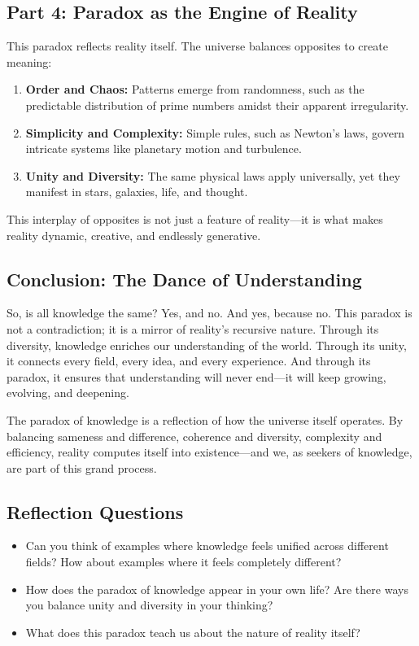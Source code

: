 \documentclass[12pt]{article}
\begin{document}
\subsection*{Part 4: Paradox as the Engine of Reality}
This paradox reflects reality itself. The universe balances opposites to create meaning:
\begin{enumerate}
    \item \textbf{Order and Chaos:} Patterns emerge from randomness, such as the predictable distribution of prime numbers amidst their apparent irregularity.
    
    \item \textbf{Simplicity and Complexity:} Simple rules, such as Newton's laws, govern intricate systems like planetary motion and turbulence.
    
    \item \textbf{Unity and Diversity:} The same physical laws apply universally, yet they manifest in stars, galaxies, life, and thought.
\end{enumerate}

This interplay of opposites is not just a feature of reality—it is what makes reality dynamic, creative, and endlessly generative.

\subsection*{Conclusion: The Dance of Understanding}
So, is all knowledge the same? Yes, and no. And yes, because no. This paradox is not a contradiction; it is a mirror of reality's recursive nature. Through its diversity, knowledge enriches our understanding of the world. Through its unity, it connects every field, every idea, and every experience. And through its paradox, it ensures that understanding will never end—it will keep growing, evolving, and deepening.

The paradox of knowledge is a reflection of how the universe itself operates. By balancing sameness and difference, coherence and diversity, complexity and efficiency, reality computes itself into existence—and we, as seekers of knowledge, are part of this grand process.

\subsection*{Reflection Questions}
\begin{itemize}
    \item Can you think of examples where knowledge feels unified across different fields? How about examples where it feels completely different?
    \item How does the paradox of knowledge appear in your own life? Are there ways you balance unity and diversity in your thinking?
    \item What does this paradox teach us about the nature of reality itself?
\end{itemize}
\end{document}
